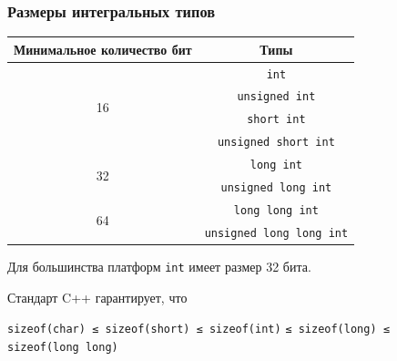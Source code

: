 \documentclass[compress, 8pt, aspectratio=169]{beamer}
\begin{document}
\begin{frame}[fragile]

    \frametitle{Размеры интегральных типов}


    \begin{table}[H]
        \begin{threeparttable}
            \begin{tabular}{|c|c|}
                \hline
                Минимальное количество бит & Типы \\
                \hline
                \hline
                \multirow{4}{4em}{16}
                & \verb|int|\tnote{*} \\
                & \verb|unsigned int| \\
                & \verb|short int| \\
                & \verb|unsigned short int| \\
                \hline
                \multirow{2}{4em}{32} & \verb|long int| \\
                & \verb|unsigned long int| \\
                \hline
                \multirow{2}{4em}{64} & \verb|long long int| \\
                & \verb|unsigned long long int| \\
                \hline
            \end{tabular}
            \begin{tablenotes}
            \small
            \item[*] Для большинства платформ
                \verb|int| имеет размер 32 бита.
            \end{tablenotes}
        \end{threeparttable}
    \end{table}

    \hfill \break
    Стандарт C++ гарантирует, что

    \begin{center}
        \verb|sizeof(char) ≤ sizeof(short) ≤ sizeof(int)|
        \verb|≤ sizeof(long) ≤ sizeof(long long)|
    \end{center}

\end{frame}
\end{document}
